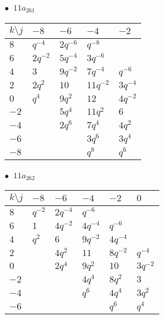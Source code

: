 \begin{minipage}{\linewidth}
$\bullet\ $ $11a_{261}$ \vspace{0.5em} \\
\begin{tabular}{l|llll}
$k \setminus j$ & $-8$ & $-6$ & $-4$ & $-2$ \\
\hline
$8$ & $q^{-4}$ & $2q^{-6}$ & $q^{-8}$ &  \\
$6$ & $2q^{-2}$ & $5q^{-4}$ & $3q^{-6}$ &  \\
$4$ & $3$ & $9q^{-2}$ & $7q^{-4}$ & $q^{-6}$ \\
$2$ & $2q^{2}$ & $10$ & $11q^{-2}$ & $3q^{-4}$ \\
$0$ & $q^{4}$ & $9q^{2}$ & $12$ & $4q^{-2}$ \\
$-2$ &  & $5q^{4}$ & $11q^{2}$ & $6$ \\
$-4$ &  & $2q^{6}$ & $7q^{4}$ & $4q^{2}$ \\
$-6$ &  &  & $3q^{6}$ & $3q^{4}$ \\
$-8$ &  &  & $q^{8}$ & $q^{6}$ \\
\end{tabular}
\vspace{2em}
\end{minipage}
%
\begin{minipage}{\linewidth}
$\bullet\ $ $11a_{262}$ \vspace{0.5em} \\
\begin{tabular}{l|lllll}
$k \setminus j$ & $-8$ & $-6$ & $-4$ & $-2$ & $0$ \\
\hline
$8$ & $q^{-2}$ & $2q^{-4}$ & $q^{-6}$ &  &  \\
$6$ & $1$ & $4q^{-2}$ & $4q^{-4}$ & $q^{-6}$ &  \\
$4$ & $q^{2}$ & $6$ & $9q^{-2}$ & $4q^{-4}$ &  \\
$2$ &  & $4q^{2}$ & $11$ & $8q^{-2}$ & $q^{-4}$ \\
$0$ &  & $2q^{4}$ & $9q^{2}$ & $10$ & $3q^{-2}$ \\
$-2$ &  &  & $4q^{4}$ & $8q^{2}$ & $3$ \\
$-4$ &  &  & $q^{6}$ & $4q^{4}$ & $3q^{2}$ \\
$-6$ &  &  &  & $q^{6}$ & $q^{4}$ \\
\end{tabular}
\vspace{2em}
\end{minipage}
%
